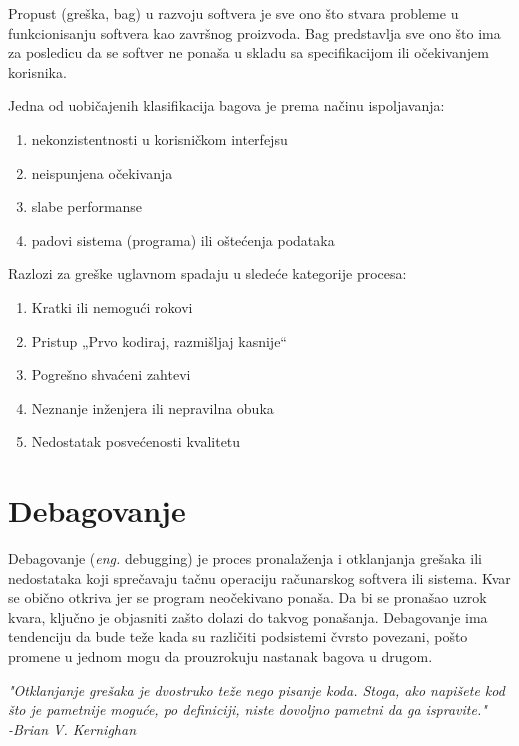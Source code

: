 \documentclass[a4paper]{article}
\begin{document}
Propust (greška, bag) u razvoju softvera je sve ono što stvara probleme u funkcionisanju softvera 
kao završnog proizvoda. Bag predstavlja sve ono što ima za posledicu da se softver ne ponaša u 
skladu sa specifikacijom ili očekivanjem korisnika. \cite{deb_app}

\vspace{4mm}

Jedna od uobičajenih klasifikacija bagova je prema načinu ispoljavanja:
\begin{enumerate}
\item nekonzistentnosti u korisničkom interfejsu
\item neispunjena očekivanja
\item slabe performanse
\item padovi sistema (programa) ili oštećenja podataka
\end{enumerate}

\vspace{4mm}

Razlozi za greške uglavnom spadaju u sledeće kategorije procesa:
\begin{enumerate}
\item Kratki ili nemogući rokovi
\item Pristup „Prvo kodiraj, razmišljaj kasnije“
\item Pogrešno shvaćeni zahtevi
\item Neznanje inženjera ili nepravilna obuka
\item Nedostatak posvećenosti kvalitetu
\end{enumerate}


\section{Debagovanje}	
\label{sec:debagovanje}

Debagovanje (\textit{eng.} debugging) je proces pronalaženja i otklanjanja grešaka ili 
nedostataka koji sprečavaju tačnu operaciju računarskog softvera ili sistema. Kvar se 
obično otkriva jer se program neočekivano ponaša. Da bi se pronašao uzrok kvara, 
ključno je objasniti zašto dolazi do takvog ponašanja. Debagovanje ima tendenciju da 
bude teže kada su različiti podsistemi čvrsto povezani, pošto promene u jednom mogu da 
prouzrokuju nastanak bagova u drugom. \cite{debagovanje}	

\vspace{4mm}

\textit{"Otklanjanje grešaka je dvostruko teže nego pisanje koda. Stoga, ako napišete kod što 
je pametnije moguće, po definiciji, niste dovoljno pametni da ga ispravite."\\
\hspace*{0pt}\hfill-Brian V. Kernighan}
\end{document}
